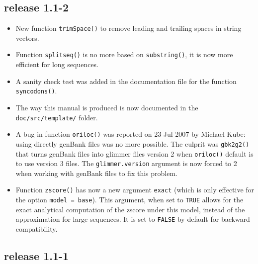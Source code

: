 \documentclass{article}
\begin{document}
\subsection*{release 1.1-2}


\begin{itemize}

\item New function \texttt{trimSpace()} to remove leading and trailing
  spaces in string vectors.

\item Function \texttt{splitseq()} is no more based on \texttt{substring()},
  it is now more efficient for long sequences.

\item A sanity check test was added in the documentation file
  for the function \texttt{syncodons()}.

\item The way this manual is produced is now documented in the
  \texttt{doc/src/template/} folder.

\item A bug in function \texttt{oriloc()} was reported on 23 Jul 2007
  by Michael Kube: using directly genBank files was no more possible.
  The culprit was \texttt{gbk2g2()} that turns genBank files into
  glimmer files version 2 when \texttt{oriloc()} default is to use
  version 3 files. The \texttt{glimmer.version} argument is now forced
  to 2 when working with genBank files to fix this problem.
 
\item Function \texttt{zscore()} has now a new argument
  \texttt{exact} (which is only effective for the option
  \texttt{model = base}). This argument, when set to 
  \texttt{TRUE} allows for the exact analytical computation 
  of the zscore under this model, instead of the approximation for
  large sequences. It is set to \texttt{FALSE} by
  default for backward compatibility.
\end{itemize}

\subsection*{release 1.1-1}
\end{document}
